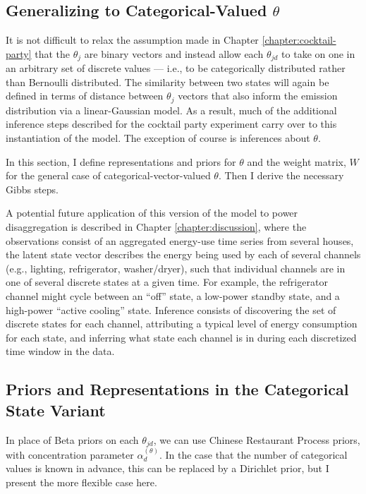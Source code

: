 \subsection{Generalizing to Categorical-Valued $\theta$}
It is not difficult to relax the assumption made in Chapter \ref{chapter:cocktail-party} 
that the $\theta_j$ are binary vectors and
instead allow each $\theta_{jd}$ to take on one in an arbitrary set of
discrete values --- i.e., to be categorically distributed rather than
Bernoulli distributed.  The similarity between two states will again be defined in terms of distance between $\theta_j$ vectors that also inform the emission distribution via a linear-Gaussian model.  As a result, much of the additional inference steps described for the 
cocktail party experiment carry over to this instantiation of the
model.  The exception of course is
inferences about $\theta$.

In this section, I define representations and priors for $\theta$ and the weight matrix, 
$W$ for the general case of categorical-vector-valued $\theta$.  Then
I derive the necessary Gibbs steps.  

A potential future application of this version of the model to power
disaggregation is described in Chapter \ref{chapter:discussion}, where the observations consist of an aggregated energy-use time series from several houses, the latent state vector describes the energy being used by each of several channels (e.g., lighting, refrigerator, washer/dryer), such that individual channels are in one of several discrete states at a given time. For example, the refrigerator channel might cycle between an ``off'' state, a low-power standby state, and a high-power ``active cooling'' state.  Inference consists of discovering the set of discrete states for each channel, attributing a typical level of energy consumption for each state, and inferring what state each channel is in during each discretized time window in the data.

\subsection{Priors and Representations in the Categorical State Variant}
\label{sec:priors-repr-categ}

In place of Beta priors on each $\theta_{jd}$, we can use Chinese
Restaurant Process priors, with concentration parameter
$\alpha_{d}^{(\theta)}$.  In the case that the number of categorical 
values is known in advance, this can be replaced by a Dirichlet 
prior, but I present the more flexible case here. 

